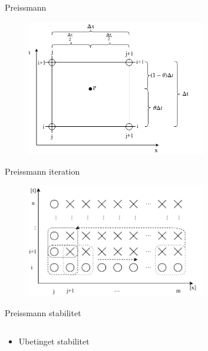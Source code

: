 \begin{frame}{Preissmann}{}
\vfill\vfill\centering
		\begin{figure}[H]
			\centering
			\includegraphics[width=0.7\textwidth]{Sections/pictures/preissmann_scheme.pdf}
		\end{figure}
\vfill\vfill		
\end{frame}

\begin{frame}{Preissmann iteration}{}
\vfill\vfill\centering
		\begin{figure}[H]
			\centering
			\includegraphics[width=0.7\textwidth]{Sections/pictures/preissmann_scheme_iteration.pdf}
		\end{figure}
\vfill\vfill		
\end{frame}

\begin{frame}{Preissmann stabilitet}{}
\vfill\vfill\centering
	\begin{columns}
		\begin{column}{0.25\textwidth}
		\vspace{20mm}
			\begin{itemize}
				\item Ubetinget stabilitet
			\end{itemize}
		\end{column}

		\begin{column}{0.7\textwidth}
			\begin{figure}[H]
	  			
			\end{figure}
		\end{column}
	\end{columns}			
\vfill\vfill		
\end{frame}



